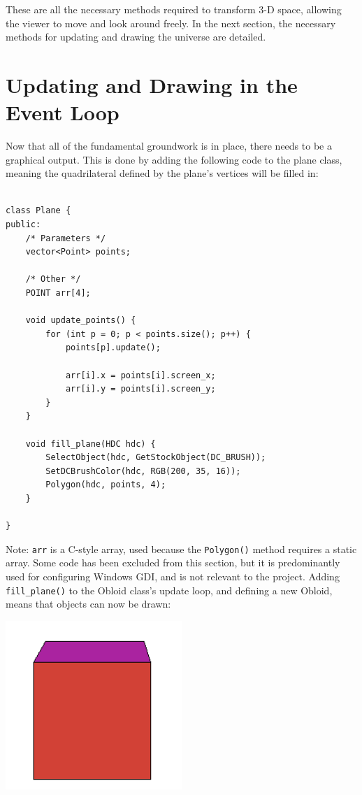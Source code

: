 \documentclass{article}
\begin{document}
These are all the necessary methods required to transform 3-D space, allowing the viewer to move and look around freely. In the next section, the necessary methods for updating and drawing the universe are detailed.
\newpage

\section{Updating and Drawing in the Event Loop}

Now that all of the fundamental groundwork is in place, there needs to be a graphical output. This is done by adding the following code to the plane class, meaning the quadrilateral defined by the plane's vertices will be filled in:

\begin{lstlisting}

class Plane {
public:
	/* Parameters */
	vector<Point> points;
	
	/* Other */
	POINT arr[4];
	
	void update_points() {
		for (int p = 0; p < points.size(); p++) {
			points[p].update();
			
			arr[i].x = points[i].screen_x;
			arr[i].y = points[i].screen_y;
		}
	}
	
	void fill_plane(HDC hdc) {	
		SelectObject(hdc, GetStockObject(DC_BRUSH));
		SetDCBrushColor(hdc, RGB(200, 35, 16));
		Polygon(hdc, points, 4);
	}
	
}
\end{lstlisting}

Note: \verb|arr| is a C-style array, used because the \verb|Polygon()| method requires a static array. Some code has been excluded from this section, but it is predominantly used for configuring Windows GDI, and is not relevant to the project.
\newpage
Adding \verb|fill_plane()| to the Obloid class's update loop, and defining a new Obloid, means that objects can now be drawn:

\begin{center}
\includegraphics[width=0.5\textwidth]{first_cube.png}
\end{center}
\end{document}
